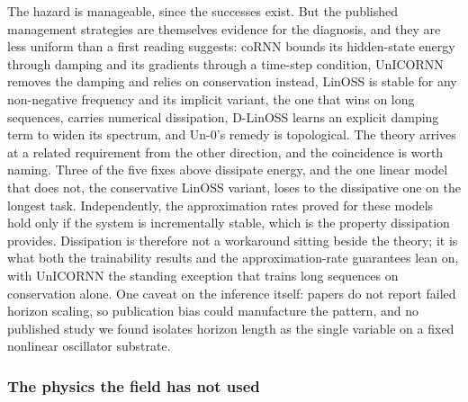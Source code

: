 \documentclass[10pt]{article}
\begin{document}
The hazard is manageable, since the successes exist. But the published
management strategies are themselves evidence for the diagnosis, and
they are less uniform than a first reading suggests: coRNN bounds its
hidden-state energy through damping and its gradients through a
time-step condition, UnICORNN removes the damping and relies on
conservation instead, LinOSS \citep{rusch2025} is stable for any
non-negative frequency and its implicit variant, the one that wins on
long sequences, carries numerical dissipation, D-LinOSS \citep{d-linoss}
learns an explicit damping term to widen its spectrum, and Un-0's remedy
is topological. The theory arrives at a related requirement from the
other direction, and the coincidence is worth naming. Three of the five
fixes above dissipate energy, and the one linear model that does not,
the conservative LinOSS variant, loses to the dissipative one on the
longest task. Independently, the approximation rates proved for these
models hold only if the system is incrementally stable, which is the
property dissipation provides. Dissipation is therefore not a workaround
sitting beside the theory; it is what both the trainability results and
the approximation-rate guarantees lean on, with UnICORNN the standing
exception that trains long sequences on conservation alone. One caveat
on the inference itself: papers do not report failed horizon scaling, so
publication bias could manufacture the pattern, and no published study
we found isolates horizon length as the single variable on a fixed
nonlinear oscillator substrate.

\subsubsection{The physics the field has not used}\label{sec-3-1-5}
\end{document}
